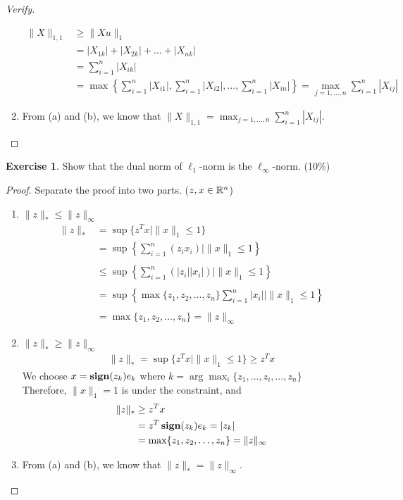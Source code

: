 \documentclass[12pt]{extarticle}
\theoremstyle{definition}
\newtheorem{exercise}{Exercise}
\begin{document}
\begin{proof}[Verify]
\begin{enumerate}[label=(\alph*)]
      \begin{align*}
        \|X\|_{1,1} &\ge \|Xu\|_1\\
                    &=   |X_{1k}|+|X_{2k}|+\dots+|X_{nk}|\\
                    &=   \sum_{i=1}^n|X_{ik}|\\
                    &=   \max\left\{\sum_{i=1}^n|X_{i1}|,\sum_{i=1}^n|X_{i2}|,\dots,\sum_{i=1}^n|X_{in}|\right\} = \max_{j=1,\dots,n}\sum_{i=1}^n|X_{ij}|
      \end{align*}
    \item From (a) and (b), we know that $\|X\|_{1,1}=\max_{j=1,\dots,n}\sum_{i=1}^n|X_{ij}|$.\qedhere
  \end{enumerate}
\end{proof}

\begin{exercise}
  Show that the dual norm of $\ell_1$-norm is the $\ell_\infty$-norm. (10\%)
\end{exercise}
\begin{proof}
  Separate the proof into two parts. ($z, x\in \mathbb{R}^n$)
  \begin{enumerate}[label=(\alph*)]
    \item $\|z\|_\ast\le \|z\|_\infty$
      \begin{align*}
        \|z\|_\ast &=   \sup\{z^Tx\mid\|x\|_1\le 1\}\\
                   &=   \sup\left\{\sum_{i=1}^n(z_ix_i)\mid\|x\|_1\le 1\right\}\\\\
                   &\le \sup\left\{\sum_{i=1}^n(|z_i||x_i|)\mid\|x\|_1\le 1\right\}\\\\
                   &=   \sup\left\{\max\{z_1,z_2,\dots,z_n\}\sum_{i=1}^n|x_i|\mid\|x\|_1\le 1\right\}\\\\
                   &=   \max\{z_1,z_2,\dots,z_n\} = \|z\|_\infty
      \end{align*}
    \item $\|z\|_\ast\ge \|z\|_\infty$
      \begin{align*}
        \|z\|_\ast = \sup\{z^Tx\mid\|x\|_1\le 1\} \ge z^Tx
      \end{align*}
      We choose $x=\mathop{\bf sign}(z_k)e_k$ where $k=\arg\max_i \{z_1,\dots,z_i,\dots,z_n\}$\\
      Therefore, $\|x\|_1=1$ is under the constraint, and
      \begin{align*}
        \|z\|_\ast&\ge z^Tx\\
                  &=   z^T\mathop{\bf sign}(z_k)e_k=|z_k|\\
                  &=   \max\{z_1,z_2,\dots,z_n\} = \|z\|_\infty
      \end{align*}
    \item From (a) and (b), we know that $\|z\|_\ast=\|z\|_\infty$.\qedhere
  \end{enumerate}
\end{proof}
\end{document}
